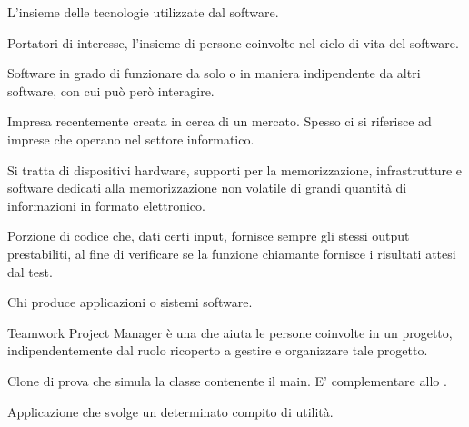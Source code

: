 \begin{itemize}
L'insieme delle tecnologie utilizzate dal software.


Portatori di interesse, l'insieme di persone coinvolte nel ciclo di vita del software.


Software in grado di funzionare da solo o in maniera indipendente da altri software, con cui può però interagire.


Impresa recentemente creata in cerca di un mercato. Spesso ci si riferisce ad imprese che operano nel settore informatico.


Si tratta di dispositivi hardware, supporti per la memorizzazione, infrastrutture e software dedicati alla memorizzazione non volatile di grandi quantità di informazioni in formato elettronico.


Porzione di codice che, dati certi input, fornisce sempre gli stessi output prestabiliti, al fine di verificare se la funzione chiamante fornisce i risultati attesi dal test.


Chi produce applicazioni o sistemi software.

\end{itemize}


\begin{itemize}


Teamwork Project Manager è una  che aiuta le persone coinvolte in un progetto, indipendentemente dal ruolo ricoperto a gestire e organizzare tale progetto.


Clone di prova che simula la classe contenente il main. E' complementare allo .


Applicazione che svolge un determinato compito di utilità.

\end{itemize}


